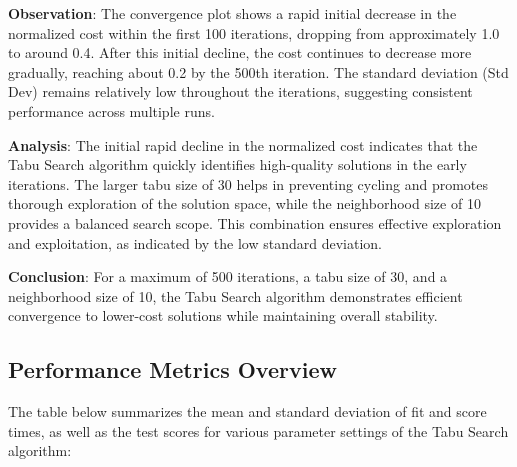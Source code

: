 \documentclass[
]{article}
\begin{document}
    \textbf{Observation}: The convergence plot shows a rapid initial decrease in the normalized cost within the first 100 iterations, dropping from approximately 1.0 to around 0.4. After this initial decline, the cost continues to decrease more gradually, reaching about 0.2 by the 500th iteration. The standard deviation (Std Dev) remains relatively low throughout the iterations, suggesting consistent performance across multiple runs.

    \textbf{Analysis}: The initial rapid decline in the normalized cost indicates that the Tabu Search algorithm quickly identifies high-quality solutions in the early iterations. The larger tabu size of 30 helps in preventing cycling and promotes thorough exploration of the solution space, while the neighborhood size of 10 provides a balanced search scope. This combination ensures effective exploration and exploitation, as indicated by the low standard deviation.

    \textbf{Conclusion}: For a maximum of 500 iterations, a tabu size of 30, and a neighborhood size of 10, the Tabu Search algorithm demonstrates efficient convergence to lower-cost solutions while maintaining overall stability.

    \subsection{Performance Metrics Overview}

    The table below summarizes the mean and standard deviation of fit and score times, as well as the test scores for various parameter settings of the Tabu Search algorithm:
\end{document}
